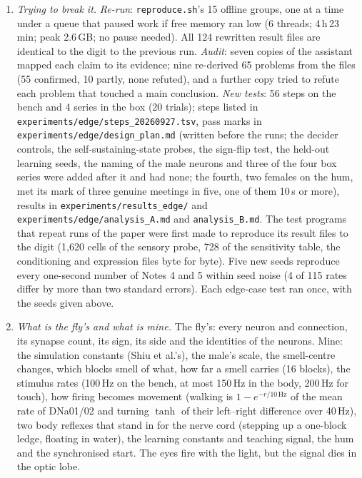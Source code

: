 \begin{enumerate}[leftmargin=*, label=\arabic*., itemsep=4pt]
\item \emph{Trying to break it.} \emph{Re-run}: \texttt{reproduce.sh}'s 15 offline groups, one at a time under a queue that paused work if free memory ran low (6 threads; 4\,h\,23\,min; peak 2.6\,GB; no pause needed). All 124 rewritten result files are identical to the digit to the previous run. \emph{Audit}: seven copies of the assistant mapped each claim to its evidence; nine re-derived 65 problems from the files (55 confirmed, 10 partly, none refuted), and a further copy tried to refute each problem that touched a main conclusion. \emph{New tests}: 56 steps on the bench and 4 series in the box (20 trials); steps listed in \texttt{experiments/edge/steps\_20260927.tsv}, pass marks in \texttt{experiments/edge/design\_plan.md} (written before the runs; the decider controls, the self-sustaining-state probes, the sign-flip test, the held-out learning seeds, the naming of the male neurons and three of the four box series were added after it and had none; the fourth, two females on the hum, met its mark of three genuine meetings in five, one of them 10\,s or more), results in \texttt{experiments/results\_edge/} and \texttt{experiments/edge/analysis\_A.md} and \texttt{analysis\_B.md}. The test programs that repeat runs of the paper were first made to reproduce its result files to the digit (1{,}620 cells of the sensory probe, 728 of the sensitivity table, the conditioning and expression files byte for byte). Five new seeds reproduce every one-second number of Notes 4 and 5 within seed noise (4 of 115 rates differ by more than two standard errors). Each edge-case test ran once, with the seeds given above.

\item \emph{What is the fly's and what is mine.} The fly's: every neuron and connection, its synapse count, its sign, its side and the identities of the neurons. Mine: the simulation constants (Shiu et al.'s), the male's scale, the smell-centre changes, which blocks smell of what, how far a smell carries (16 blocks), the stimulus rates (100\,Hz on the bench, at most 150\,Hz in the body, 200\,Hz for touch), how firing becomes movement (walking is $1-e^{-r/10\,\text{Hz}}$ of the mean rate of DNa01/02 and turning $\tanh$ of their left--right difference over 40\,Hz), two body reflexes that stand in for the nerve cord (stepping up a one-block ledge, floating in water), the learning constants and teaching signal, the hum and the synchronised start. The eyes fire with the light, but the signal dies in the optic lobe.

\end{enumerate}

